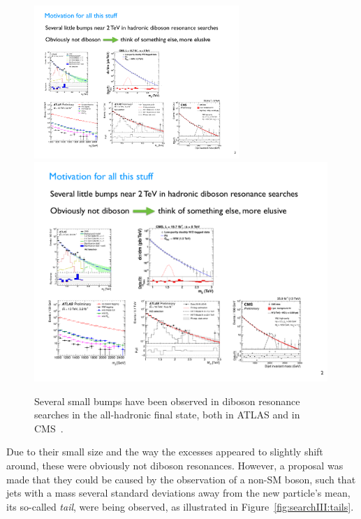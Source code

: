 \begin{figure}[h!] 
    \centering
    \includegraphics[width=0.69\textwidth]{figures/analysis/search3/misc/bumps2.pdf}\\
    \includegraphics[width=0.99\textwidth]{figures/analysis/search3/misc/bumps1.pdf}\\
    \caption{Several small bumps have been observed in diboson resonance searches in the all-hadronic final state, both in ATLAS and in CMS~\cite{stealth}.}
    \label{fig:searchIII:bumps}
\end{figure}
Due to their small size and the way the excesses appeared to slightly shift around, these were obviously not diboson resonances. However, a proposal was made that they could be caused by the observation of a non-SM boson, such that jets with a mass several standard deviations away from the new particle's mean, its so-called {\it tail}, were being observed, as illustrated in Figure~\ref{fig:searchIII:tails}.
